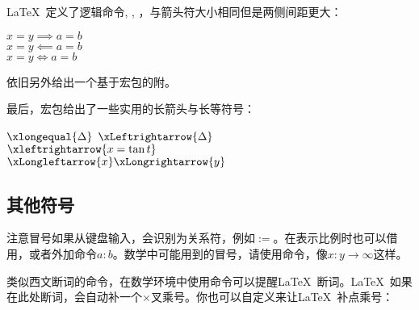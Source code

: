 \LaTeX\ 定义了逻辑命令, , ，与箭头符大小相同但是两侧间距更大：
\begin{codeshow}
$x=y \implies a=b$\\
$x=y \impliedby a=b$\\
$x=y \iff a=b$
\end{codeshow}

依旧另外给出一个基于宏包的附。
\begin{table}[!htb]
\centering
\caption{amssymb箭头}
\label{tab:amsarrow}
\renewcommand\arraystretch{1}
\end{table}

最后，宏包给出了一些实用的长箭头与长等符号：

\begin{codeshow}
$\xlongequal{\Delta}$\quad
$\xLeftrightarrow{\Delta}$\\
$\xleftrightarrow{x=\tan t}$\\
$\xLongleftarrow{x} \xLongrightarrow{y}$
\end{codeshow}

\subsection{其他符号}
注意冒号如果从键盘输入，会识别为关系符，例如$:=$。在表示比例时也可以借用，或者外加命令$a\mathbin{:}b$。数学中可能用到的冒号，请使用命令，像$x\colon y\to\infty$这样。

类似西文断词的\latexline{-}命令，在数学环境中使用\latexline{*}命令可以提醒\LaTeX\ 断词。\LaTeX\ 如果在此处断词，会自动补一个$\times$叉乘号。你也可以自定义来让\LaTeX\ 补点乘号：
\begin{latex}
\renewcommand{\*}{\discretionary{\,\mbox{$\cdot$}}{}{}}
\end{latex}

